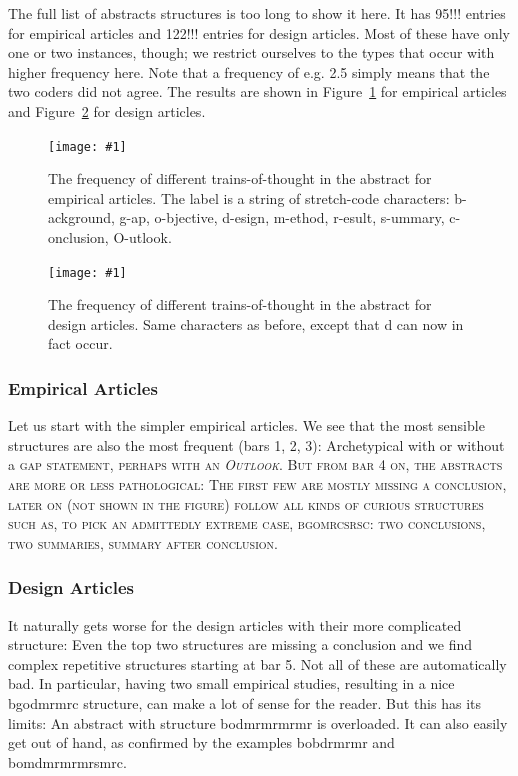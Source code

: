 \documentclass[10pt,journal,compsoc]{IEEEtran}
\newcommand{\Plot}[2]{%
	\begin{figure}[htb]%
		\centering\texttt{[image: \#1]}%
		\vspace{-4mm}\caption{#2}\label{#1}%
	\end{figure}}
\newcommand{\Cb}[1]{\bgroup\scshape #1\egroup}  %
\begin{document}
The full list of abstracts structures is too long to show it here.
It has 95!!! entries for empirical articles and 122!!! entries for design articles.
Most of these have only one or two instances, though; 
we restrict ourselves to the types that occur with higher frequency here. 
Note that a frequency of e.g. 2.5 simply means that the two coders did not agree.
The results are shown in 
Figure~\ref{ab_topicstructure_freqs_empir} for empirical articles and
Figure~\ref{ab_topicstructure_freqs_design} for design articles.

\Plot{ab_topicstructure_freqs_empir}{%
  The frequency of different trains-of-thought in the abstract for empirical articles.
  The label is a string of stretch-code characters:
  b-ackground, g-ap, o-bjective, d-esign, m-ethod, r-esult, s-ummary, c-onclusion, O-utlook.}
\Plot{ab_topicstructure_freqs_design}{%
  The frequency of different trains-of-thought in the abstract for design articles.
  Same characters as before, except that d can now in fact occur.}

\subsubsection{Empirical Articles}

Let us start with the simpler empirical articles.
We see that the most sensible structures are also the most frequent (bars 1, 2, 3):
Archetypical with or without a \Cb{gap} statement, perhaps with an \emph{Outlook}.
But from bar 4 on, the abstracts are more or less pathological:
The first few are mostly missing a conclusion, later on (not shown in the figure)
follow all kinds of curious structures such as, to pick an admittedly extreme case,
bgomrcsrsc: two conclusions, two summaries, summary after conclusion.

\subsubsection{Design Articles}

It naturally gets worse for the design articles with their more complicated structure:
Even the top two structures are missing a conclusion
and we find complex repetitive structures starting at bar 5.
Not all of these are automatically bad. 
In particular, having two small empirical studies, resulting in a nice bgodmrmrc structure,
can make a lot of sense for the reader.
But this has its limits: An abstract with structure bodmrmrmrmr is overloaded.
It can also easily get out of hand, as confirmed by the examples bobdrmrmr and bomdmrmrmrsmrc.
\end{document}

